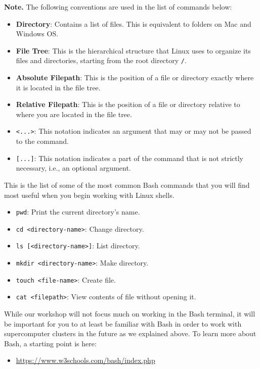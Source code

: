 \documentclass{article}
\begin{document}
\noindent \textbf{Note.} The following conventions are used in the list of commands below:
\begin{itemize}
    \item \textbf{Directory}: Contains a list of files. This is equivalent to folders on Mac and Windows OS. 
    \item \textbf{File Tree}: This is the hierarchical structure that Linux uses to organize its files and directories, starting from the root directory \texttt{/}. 
    \item \textbf{Absolute Filepath}: This is the position of a file or directory exactly where it is located in the file tree.
    \item \textbf{Relative Filepath}: This is the position of a file or directory relative to where you are located in the file tree. 
    \item \texttt{<...>}: This notation indicates an argument that may or may not be passed to the command. 
    \item \texttt{[...]}: This notation indicates a part of the command that is not strictly necessary, i.e., an optional argument. 
\end{itemize}

\noindent This is the list of some of the most common Bash commands that you will find most useful when you begin working with Linux shells. 

\begin{itemize}
    \item \texttt{pwd}: Print the current directory's name. 
    \item \texttt{cd <directory-name>}: Change directory.
    \item \texttt{ls [<directory-name>]}: List directory.
    \item \texttt{mkdir <directory-name>}: Make directory. 
    \item \texttt{touch <file-name>}: Create file.
    \item \texttt{cat <filepath>}: View contents of file without opening it. 
\end{itemize}

\noindent While our workshop will not focus much on working in the Bash terminal, it will be important for you to at least be familiar with Bash in order to work with supercomputer clusters in the future as we explained above. To learn more about Bash, a starting point is here:

\begin{itemize}
    \item \url{https://www.w3schools.com/bash/index.php}
\end{itemize}
\end{document}
